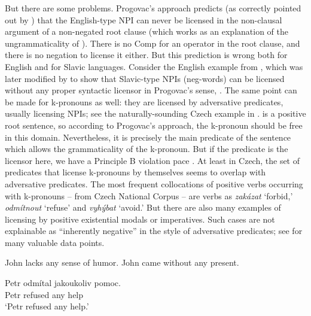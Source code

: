 \documentclass[output=paper,colorlinks,citecolor=brown]{langscibook}
\begin{document}
\noindent But there are some problems. Progovac's approach predicts (as correctly pointed out by \citealt[212--213]{krifka1995semantics}) that the English-type NPI can never be licensed in the non-clausal argument of a non-negated root clause (which works as an explanation of the ungrammaticality of ). There is no Comp for an operator in the root clause, and there is no negation to license it either. But this prediction is wrong both for English and for Slavic languages. Consider the English example from \citet[213]{krifka1995semantics}, which was later modified by \citet{Blaszczak2001} to show that Slavic-type NPIs (neg-words) can be licensed without any proper syntactic licensor in Progovac's sense, . The same point can be made for k-pronouns as well: they are licensed by adversative predicates, usually licensing NPIs; see the naturally-sounding Czech example in .  is a positive root sentence, so according to Progovac's approach, the k-pronoun should be free in this domain.  Nevertheless, it is precisely the main predicate of the sentence which allows the grammaticality of the k-pronoun. But if the predicate is the licensor here, we have a Principle B violation pace \citet{Progovac1993a}. At least in Czech, the set of predicates that license k-pronouns by themselves seems to overlap with adversative predicates. The most frequent collocations of positive verbs occurring with k-pronouns -- from Czech National Corpus -- are verbs as \textit{zakázat} `forbid,' \textit{odmítnout} `refuse' and \textit{vyhýbat} `avoid.' But there are also many examples of licensing by positive existential modals or imperatives. Such cases are not explainable as ``inherently negative'' in the style of adversative predicates; see \citet{Strachonova2016} for many valuable data points.

\ea\ea\label{ex:8-a} John lacks any sense of humor.
\ex\label{ex:8-b} John came without any present.
\z
\z

\ea\label{ex:9} \gll Petr odmítal jakoukoliv pomoc.\\
Petr refused any help\\
\glt `Petr refused any help.'%
\z
\end{document}

